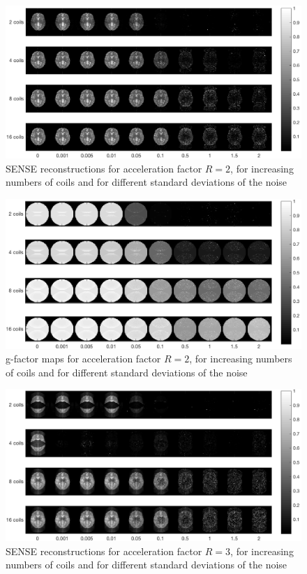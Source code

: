 \begin{figure}[H]
    \centering
    \includegraphics[width=1\textwidth,keepaspectratio]{R2recnoiseb}
    \caption{SENSE reconstructions for acceleration factor $R = 2$, for increasing numbers of coils and for different standard deviations of the noise}
    \label{fig:R2recsnoisej}
\end{figure}

\begin{figure}[H]
    \centering
    \includegraphics[width=1\textwidth,keepaspectratio]{R2gfactnoiseb}
    \caption{g-factor maps for acceleration factor $R = 2$, for increasing numbers of coils and for different standard deviations of the noise}
    \label{fig:R2gfactnoisej}
\end{figure}

\begin{figure}[H]
    \centering
    \includegraphics[width=1\textwidth,keepaspectratio]{R3recnoiseb}
    \caption{SENSE reconstructions for acceleration factor $R = 3$, for increasing numbers of coils and for different standard deviations of the noise}
    \label{fig:R3recsnoisej}
\end{figure}

